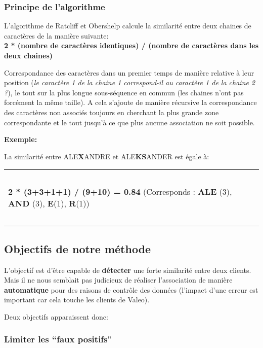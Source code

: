 \subsubsection{Principe de l'algorithme}

L'algorithme de Ratcliff et Obershelp calcule la similarité entre deux chaines de caractères de la manière suivante:\\

\textbf{2 * (nombre de caractères identiques) / (nombre de caractères dans les deux chaines)}

Correspondance des caractères dans un premier temps de manière relative à leur position (\textit{le caractère 1 de la chaine 1 correspond-il au caractère 1 de la chaine 2 ?}), le tout sur la plus longue sous-séquence en commun (les chaines n'ont pas forcément la même taille). A cela s'ajoute de manière récursive la correspondance des caractères non associés toujours en cherchant la plus grande zone correspondante et le tout jusqu'à ce que plus aucune association ne soit possible.

\textbf{Exemple:}

La similarité entre ALE\textbf{X}ANDRE et ALE\textbf{KS}ANDER est égale à:


\begin{tabular}{|>{\centering\arraybackslash}p{18cm}|}
  \hline
  ~\\
  \textbf{2 * (3+3+1+1) / (9+10) = 0.84}  (Corresponds : \textbf{ALE} (3), \textbf{AND} (3), \textbf{E}(1), \textbf{R}(1))\\
  ~\\
  \hline
\end{tabular}

\clearpage

\subsection{Objectifs de notre méthode}

L'objectif est d'être capable de \textbf{détecter} une forte similarité entre deux clients. Mais il ne nous semblait pas judicieux de réaliser l'association de manière \textbf{automatique} pour des raisons de contrôle des données (l'impact d'une erreur est important car cela touche les clients de Valeo).

Deux objectifs apparaissent donc:

\subsubsection{Limiter les ``faux positifs"}

